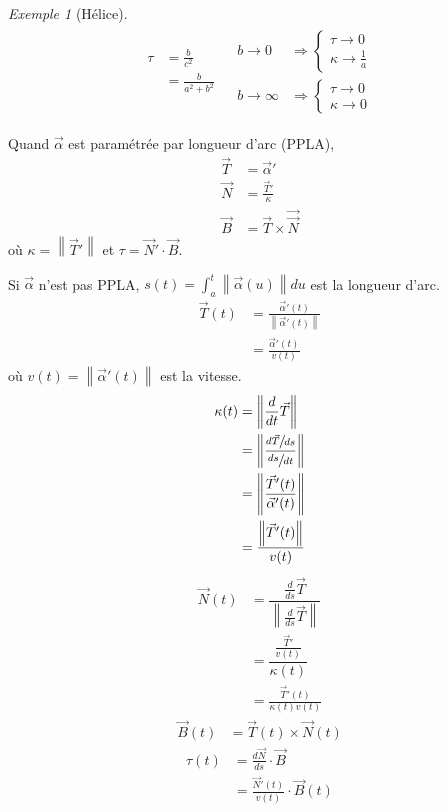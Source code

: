 \documentclass{report}
\theoremstyle{definition}
\theoremstyle{remark}
\newtheorem*{exem}{Exemple}
\newcommand*{\norme}[1]{\left\|#1\right\|}
\begin{document}
\begin{exem}[H\'elice]
\begin{align*}
\begin{split}
				\tau&= \frac{b}{c^2}\\
				&= \frac{b}{a^2+b^2}
			\end{split}
			&
			\begin{split}
				b\to0&\Rightarrow\left\{\begin{array}{c}
					\tau\to0\\
					\kappa\to\frac{1}{a}
				\end{array}\right.\\
				b\to\infty&\Rightarrow\left\lbrace\begin{array}{c}
					\tau\to0\\
					\kappa\to0
				\end{array}\right.
			\end{split}
		\end{align*}
	\end{exem}

	Quand $\vec\alpha$ est param\'etr\'ee par longueur d'arc (PPLA),
	\begin{align*}
		\vec T&= \vec\alpha'\\
		\vec N&= \frac{\vec T'}{\kappa}\\
		\vec B&= \vec T \times \vec \vec N
	\end{align*}
	o\`u $\kappa=\norme{\vec T'}$ et $\tau=\vec N' \cdot \vec B$.

	Si $\vec\alpha$ n'est pas PPLA, $s(t) = \int_{a}^{t} \norme{\vec\alpha(u)}du$ est la longueur d'arc.
	\begin{align*}
		\vec T(t)&= \frac{\vec\alpha'(t)}{\norme{\vec\alpha'(t)}}\\
		&= \frac{\vec\alpha'(t)}{v(t)}
	\end{align*}
	o\`u $v(t)=\norme{\vec\alpha'(t)}$ est la vitesse.
	\begin{align*}
		\kappa(t)&= \norme{\frac{d}{dt}\vec T}\\
		&= \norme{\frac{\sfrac{d\vec T}{ds}}{\sfrac{ds}{dt}}}\\
		&= \norme{\frac{\vec T'(t)}{\vec\alpha'(t)}}\\
		&= \frac{\norme{\vec T'(t)}}{v(t)}
	\end{align*}
	\begin{align*}
		\vec N(t)&= \dfrac{\frac{d}{ds}\vec T}{\norme{\frac{d}{ds}\vec T}}\\
		&= \dfrac{\frac{\vec T'}{v(t)}}{\kappa(t)}\\
		&= \frac{\vec T'(t)}{\kappa(t)v(t)}
	\end{align*}
	\begin{align*}
		\vec B(t)&= \vec T(t) \times \vec N(t)
	\end{align*}
	\begin{align*}
		\tau(t)&= \frac{d\vec N}{ds} \cdot \vec B\\
		&= \frac{\vec N'(t)}{v(t)} \cdot \vec B(t)
	\end{align*}
\end{document}
